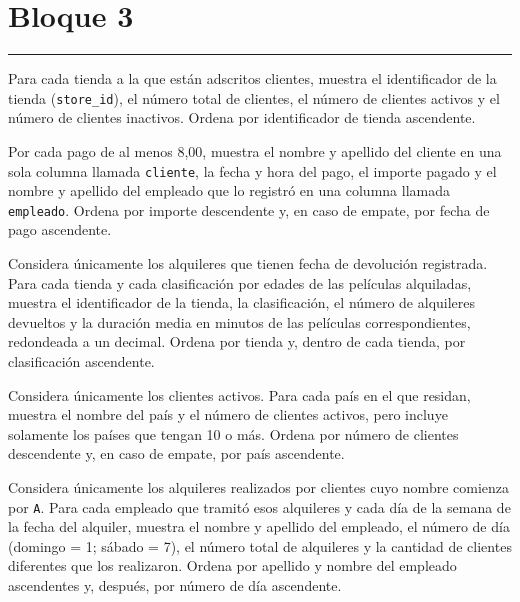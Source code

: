 \documentclass[11pt,a4paper]{article}
\begin{document}
\section*{Bloque 3}\vspace{-3mm}\color{LBcereza}\rule{\textwidth}{0.5pt}\color{LBtexto}
\par{}\par\smallskip Para cada tienda a la que están adscritos clientes, muestra el identificador de la tienda (\texttt{store\_id}), el número total de clientes, el número de clientes activos y el número de clientes inactivos. Ordena por identificador de tienda ascendente.\par\medskip
{}\par{}\par\smallskip Por cada pago de al menos 8,00, muestra el nombre y apellido del cliente en una sola columna llamada \texttt{cliente}, la fecha y hora del pago, el importe pagado y el nombre y apellido del empleado que lo registró en una columna llamada \texttt{empleado}. Ordena por importe descendente y, en caso de empate, por fecha de pago ascendente.\par\medskip
{}\par{}\par\smallskip Considera únicamente los alquileres que tienen fecha de devolución registrada. Para cada tienda y cada clasificación por edades de las películas alquiladas, muestra el identificador de la tienda, la clasificación, el número de alquileres devueltos y la duración media en minutos de las películas correspondientes, redondeada a un decimal. Ordena por tienda y, dentro de cada tienda, por clasificación ascendente.\par\medskip
{}\par{}\par\smallskip Considera únicamente los clientes activos. Para cada país en el que residan, muestra el nombre del país y el número de clientes activos, pero incluye solamente los países que tengan 10 o más. Ordena por número de clientes descendente y, en caso de empate, por país ascendente.\par\medskip
{}\par{}\par\smallskip Considera únicamente los alquileres realizados por clientes cuyo nombre comienza por \texttt{A}. Para cada empleado que tramitó esos alquileres y cada día de la semana de la fecha del alquiler, muestra el nombre y apellido del empleado, el número de día (domingo = 1; sábado = 7), el número total de alquileres y la cantidad de clientes diferentes que los realizaron. Ordena por apellido y nombre del empleado ascendentes y, después, por número de día ascendente.\par\medskip
\end{document}
